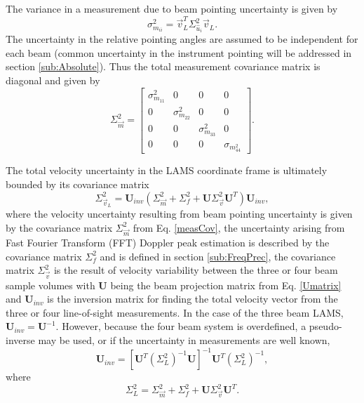 \documentclass[12pt,twoside,english]{article}\usepackage[]{graphicx}\usepackage[]{color}
\begin{document}
{{The variance in a measurement due to beam pointing uncertainty is given by  
\begin{equation}
\sigma_{m_{ii}}^{2}=\vec{v}_{L}^{T}\Sigma_{\hat{u}_{i}}^{2}\vec{v}_{L}.\label{measUncert} 
\end{equation}
The uncertainty in the relative pointing angles are assumed to be independent for each beam (common uncertainty in the instrument pointing will be addressed in section \ref{sub:Absolute}). Thus the total measurement covariance matrix is diagonal and given by  
\begin{equation}
\Sigma_{\vec{m}}^2=\left[\begin{array}{cccc} \sigma_{m_{11}}^2 & 0 & 0 & 0 \\                                                  0 & \sigma_{m_{22}}^2 & 0 & 0 \\                                                 0 & 0 & \sigma_{m_{33}}^2 & 0 \\                                                 0 & 0 & 0 & \sigma_{m_{44}^2} \end{array} \right].\label{measCov} 
\end{equation}

The total velocity uncertainty in the LAMS coordinate frame is ultimately bounded by its covariance matrix  
\begin{equation}
\Sigma_{\vec{v}_{L}}^{2}=\mathbf{U}_{inv}\left(\Sigma_{\vec{m}}^{2}+\Sigma_{f}^{2}+\mathbf{U}\Sigma_{\vec{v}}^{2}\mathbf{U}^{T}\right)\mathbf{U}_{inv},\label{VlamsError} 
\end{equation}
where the velocity uncertainty resulting from beam pointing uncertainty is given by the covariance matrix $\Sigma_{\vec{m}}^{2}$ from Eq.  \eqref{measCov}, the uncertainty arising from Fast Fourier Transform (FFT) Doppler peak estimation is described by the covariance matrix $\Sigma_{f}^{2}$ and is defined in section \ref{sub:FreqPrec}, the covariance matrix $\Sigma_{\vec{v}}^{2}$ is the result of velocity variability between the three or four beam sample volumes with $\mathbf{U}$ being the beam projection matrix from Eq. \eqref{Umatrix} and $\mathbf{U}_{inv}$ is the inversion matrix for finding the total velocity vector from the three or four line-of-sight measurements. In the case of the three beam LAMS, $\mathbf{U}_{inv}=\mathbf{U}^{-1}$.  However, because the four beam system is overdefined, a pseudo-inverse may be used, or if the uncertainty in measurements are well known, 
\begin{equation}
\mathbf{U}_{inv}=\left[\mathbf{U}^{T}\left(\Sigma_{L}^{2}\right)^{-1}\mathbf{U}\right]^{-1}\mathbf{U}^{T}\left(\Sigma_{L}^{2}\right)^{-1},\label{OptInv}
\end{equation}
where  
\begin{equation}
\Sigma_{L}^{2}=\Sigma_{\vec{m}}^{2}+\Sigma_{f}^{2}+\mathbf{U}\Sigma_{\vec{v}}^{2}\mathbf{U}^{T}.\label{TotalMeasUncert} 
\end{equation}

}}
\end{document}
